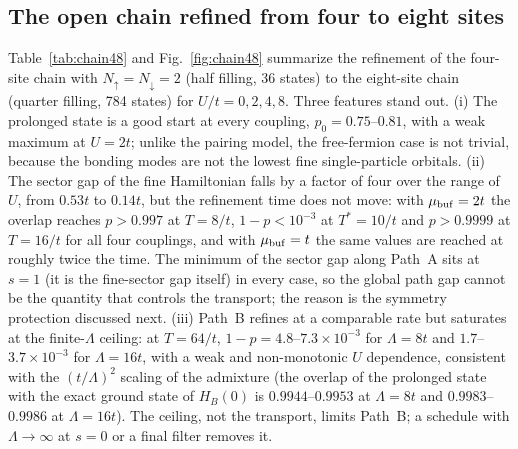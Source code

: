 \documentclass[
  aps,
  prc,
  reprint,
  superscriptaddress,
  floatfix,
  nofootinbib
]{revtex4-2}
\begin{document}
\subsection{The open chain refined from four to eight sites}
\label{sec:chain48}
Table~\ref{tab:chain48} and Fig.~\ref{fig:chain48} summarize the refinement
of the four-site chain with $N_\uparrow=N_\downarrow=2$ (half filling, 36
states) to the eight-site chain (quarter filling, 784 states) for
$U/t=0,2,4,8$.  Three features stand out.  (i) The prolonged state is a good
start at every coupling, $p_0=0.75$--$0.81$, with a weak maximum at $U=2t$;
unlike the pairing model, the free-fermion case is not trivial, because the
bonding modes are not the lowest fine single-particle orbitals.  (ii) The
sector gap of the fine Hamiltonian falls by a factor of four over the range
of $U$, from $0.53t$ to $0.14t$, but the refinement time does not move: with
$\mu_{\rm buf}=2t$ the overlap reaches $p>0.997$ at $T=8/t$,
$1-p<10^{-3}$ at $T^*=10/t$ and $p>0.9999$ at $T=16/t$ for all four
couplings, and with $\mu_{\rm buf}=t$ the same values are reached at roughly
twice the time.  The minimum of the sector gap along Path~A sits at $s=1$
(it is the fine-sector gap itself) in every case, so the global path gap
cannot be the quantity that controls the transport; the reason is the symmetry
protection discussed next.  (iii) Path~B refines at a comparable rate but
saturates at the finite-$\Lambda$ ceiling: at $T=64/t$,
$1-p=4.8$--$7.3\times10^{-3}$ for $\Lambda=8t$ and $1.7$--$3.7\times10^{-3}$
for $\Lambda=16t$, with a weak and non-monotonic $U$ dependence, consistent
with the $(t/\Lambda)^2$ scaling of the admixture (the overlap of the
prolonged state with the exact ground state of $H_B(0)$ is $0.9944$--$0.9953$
at $\Lambda=8t$ and $0.9983$--$0.9986$ at $\Lambda=16t$).  The ceiling, not
the transport, limits Path~B; a schedule with $\Lambda\to\infty$ at $s=0$ or
a final filter removes it.
\end{document}
